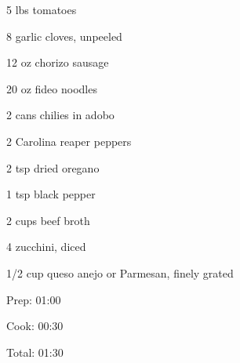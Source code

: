\documentclass[oneside]{book}  %
\begin{document}
\begin{IT}
  \begin{ingredients}
    \item[5 lbs] tomatoes
    \item[8] garlic cloves, unpeeled
    \item[12 oz] chorizo sausage
    \item[20 oz] fideo noodles
    \item[2 cans] chilies in adobo
    \item[2] Carolina reaper peppers
    \item[2 tsp] dried oregano
    \item[1 tsp] black pepper
    \item[2 cups] beef broth
    \item[4] zucchini, diced
    \item[1/2 cup] queso anejo or Parmesan, finely grated 
  \end{ingredients}

  \switchcolumn

  \begin{timeline}
    \item[Prep:]  01:00
    \item[Cook:]  00:30
    \item[Total:] 01:30
  \end{timeline}
\end{IT}
\end{document}
